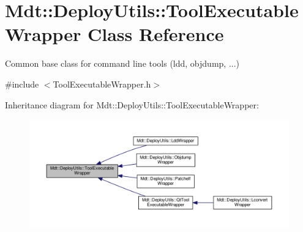 \hypertarget{class_mdt_1_1_deploy_utils_1_1_tool_executable_wrapper}{}\section{Mdt\+:\+:Deploy\+Utils\+:\+:Tool\+Executable\+Wrapper Class Reference}
\label{class_mdt_1_1_deploy_utils_1_1_tool_executable_wrapper}


Common base class for command line tools (ldd, objdump, ...)  




{\ttfamily \#include $<$Tool\+Executable\+Wrapper.\+h$>$}



Inheritance diagram for Mdt\+:\+:Deploy\+Utils\+:\+:Tool\+Executable\+Wrapper\+:\nopagebreak
\begin{figure}[H]
\begin{center}
\leavevmode
\includegraphics[width=350pt]{class_mdt_1_1_deploy_utils_1_1_tool_executable_wrapper__inherit__graph}
\end{center}
\end{figure}
